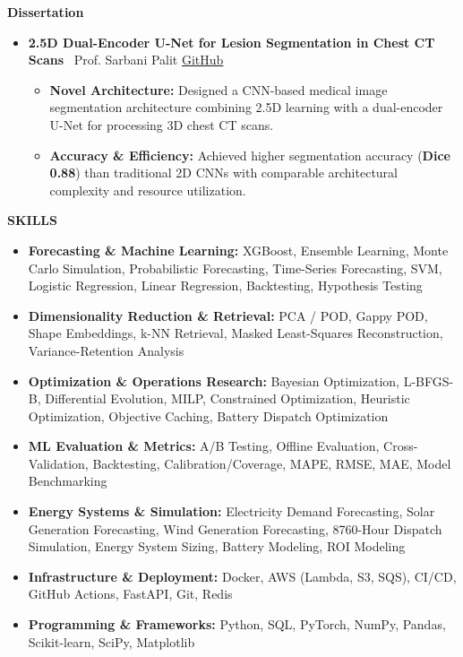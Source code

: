 \documentclass[10pt,article]{article}
\newcommand{\resheading}[1]{%
 \vspace{7pt}%
 \noindent\colorbox{mygrey}{\parbox{\dimexpr\textwidth-2\fboxsep\relax}{\textbf{\small #1}}}%
 \vspace{4pt}%
}
\begin{document}
\resheading{Dissertation}
\begin{itemize}
   \item \textbf{2.5D Dual-Encoder U-Net for Lesion Segmentation in Chest CT Scans} \textbar\ Prof. Sarbani Palit \hfill \href{YOUR_GITHUB_LINK}{GitHub}
   \begin{itemize}
       \item \textbf{Novel Architecture:} Designed a CNN-based medical image segmentation architecture combining 2.5D learning with a dual-encoder U-Net for processing 3D chest CT scans.
       \item \textbf{Accuracy \& Efficiency:} Achieved higher segmentation accuracy (\textbf{Dice 0.88}) than traditional 2D CNNs with comparable architectural complexity and resource utilization.
   \end{itemize}
\end{itemize}

\resheading{SKILLS}
\begin{itemize}[itemsep=3.5pt]
\item \textbf{Forecasting \& Machine Learning:} XGBoost, Ensemble Learning, Monte Carlo Simulation, Probabilistic Forecasting, Time-Series Forecasting, SVM, Logistic Regression, Linear Regression, Backtesting, Hypothesis Testing
\item \textbf{Dimensionality Reduction \& Retrieval:} PCA / POD, Gappy POD, Shape Embeddings, k-NN Retrieval, Masked Least-Squares Reconstruction, Variance-Retention Analysis
\item \textbf{Optimization \& Operations Research:} Bayesian Optimization, L-BFGS-B, Differential Evolution, MILP, Constrained Optimization, Heuristic Optimization, Objective Caching, Battery Dispatch Optimization
\item \textbf{ML Evaluation \& Metrics:} A/B Testing, Offline Evaluation, Cross-Validation, Backtesting, Calibration/Coverage, MAPE, RMSE, MAE, Model Benchmarking
\item \textbf{Energy Systems \& Simulation:} Electricity Demand Forecasting, Solar Generation Forecasting, Wind Generation Forecasting, 8760-Hour Dispatch Simulation, Energy System Sizing, Battery Modeling, ROI Modeling
\item \textbf{Infrastructure \& Deployment:} Docker, AWS (Lambda, S3, SQS), CI/CD, GitHub Actions, FastAPI, Git, Redis
\item \textbf{Programming \& Frameworks:} Python, SQL, PyTorch, NumPy, Pandas, Scikit-learn, SciPy, Matplotlib
\end{itemize}
\end{document}
